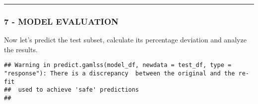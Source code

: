 \documentclass[
]{article}
\newenvironment{Shaded}{\begin{snugshade}}{\end{snugshade}}
\newcommand{\AttributeTok}[1]{\textcolor[rgb]{0.77,0.63,0.00}{#1}}
\newcommand{\CommentTok}[1]{\textcolor[rgb]{0.56,0.35,0.01}{\textit{#1}}}
\newcommand{\FunctionTok}[1]{\textcolor[rgb]{0.00,0.00,0.00}{#1}}
\newcommand{\NormalTok}[1]{#1}
\newcommand{\OtherTok}[1]{\textcolor[rgb]{0.56,0.35,0.01}{#1}}
\newcommand{\SpecialCharTok}[1]{\textcolor[rgb]{0.00,0.00,0.00}{#1}}
\newcommand{\StringTok}[1]{\textcolor[rgb]{0.31,0.60,0.02}{#1}}
\begin{document}
\begin{center}\rule{0.5\linewidth}{0.5pt}\end{center}

\hypertarget{model-evaluation}{%
\subsubsection{7 - MODEL EVALUATION}\label{model-evaluation}}

Now let's predict the test subset, calculate its percentage deviation
and analyze the results.

\begin{Shaded}
\end{Shaded}

\begin{verbatim}
## Warning in predict.gamlss(model_df, newdata = test_df, type = "response"): There is a discrepancy  between the original and the re-fit 
##  used to achieve 'safe' predictions 
## 
\end{verbatim}
\end{document}
